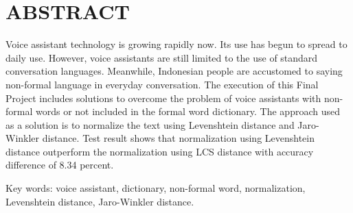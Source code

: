 \clearpage
\chapter*{ABSTRACT}

Voice assistant technology is growing rapidly now. Its use has begun to spread to daily use. However, voice assistants are still limited to the use of standard conversation languages. Meanwhile, Indonesian people are accustomed to saying non-formal language in everyday conversation. The execution of this Final Project includes solutions to overcome the problem of voice assistants with non-formal words or not included in the formal word dictionary. The approach used as a solution is to normalize the text using Levenshtein distance and Jaro-Winkler distance. Test result shows that normalization using Levenshtein distance outperform the normalization using LCS distance with accuracy difference of 8.34 percent.

\vspace{15mm}
Key words: voice assistant, dictionary, non-formal word, normalization, Levenshtein distance, Jaro-Winkler distance.

\clearpage